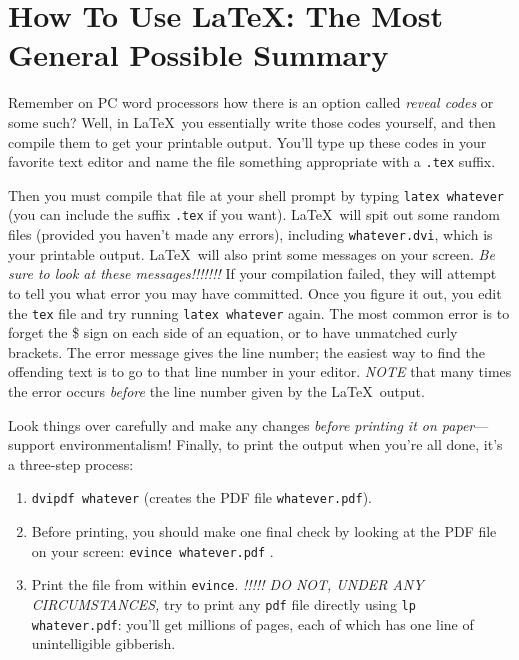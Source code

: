 \documentclass[12pt,preprint]{aastex}
\begin{document}
\section{How To Use \LaTeX: The Most General Possible Summary}
\label{howtosec}

        Remember on PC word processors how there is an option called
{\it reveal codes} or some such? Well, in \LaTeX\ you essentially write
those codes yourself, and then compile them to get your printable
output.  You'll type up these codes in your favorite text editor and
name the file something appropriate with a \verb&.tex& suffix.

        Then you must compile that file at your shell prompt by typing
\verb&latex whatever& (you can include the suffix {\tt .tex} if you
want).  \LaTeX\ will spit out some random files (provided you haven't
made any errors), including \verb&whatever.dvi&, which is your printable
output.  \LaTeX\ will also print some messages on your screen.  {\it Be
sure to look at these messages!!!!!!!}  If your compilation failed, they
will attempt to tell you what error you may have committed.  Once you
figure it out, you edit the {\tt tex} file and try running {\tt latex
whatever} again.  The most common error is to forget the \$ sign on each
side of an equation, or to have unmatched curly brackets.  The error
message gives the line number; the easiest way to find the offending
text is to go to that line number in your editor. {\it NOTE} that many
times the error occurs {\it before} the line number given by the \LaTeX\
output.

Look things over carefully and make any changes {\it before printing it
on paper}---support environmentalism!  Finally, to print the output when
you're all done, it's a three-step process:
\begin{enumerate}

\item \verb$dvipdf whatever$ (creates the PDF file {\tt whatever.pdf}).

\item Before printing, you should make one final check by looking
at the PDF file on your screen: {\tt evince whatever.pdf} .

\item Print the file from within {\tt evince}. {\it !!!!! DO NOT, UNDER
  ANY CIRCUMSTANCES,} try to print any {\tt pdf} file directly using
  {\tt lp whatever.pdf}: you'll get millions of pages, each of which has
  one line of unintelligible gibberish.
\end{enumerate}
\end{document}

